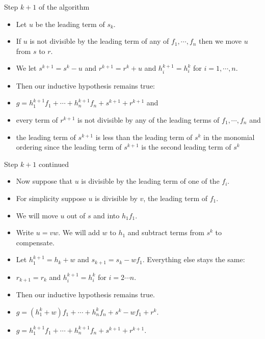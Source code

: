 \documentclass{beamer}
\begin{document}
\begin{frame}{Step $k+1$ of the algorithm}

\begin{itemize}
  \item Let $u$ be the leading term of $s_k$.
  \item If $u$ is not divisible by the leading term of any of $f_1,\cdots,f_n$ then we move $u$ from $s$ to $r$.
  \item We let $s^{k+1} = s^k - u$ and $r^{k+1} = r^k + u$ and $h_i^{k+1} = h_i^k$ for $i=1,\cdots,n$.
  \item Then our inductive hypothesis remains true:
  \item $g = h_1^{k+1} f_1 + \cdots + h_n^{k+1} f_n + s^{k+1} + r^{k+1}$ and
  \item every term of $r^{k+1}$ is not divisible by any of the leading terms of $f_1,\cdots, f_n$ and
  \item the leading term of $s^{k+1}$ is less than the leading term of $s^k$ in the monomial ordering since the leading
  term of $s^{k+1}$ is the second leading term of $s^k$
\end{itemize}

\end{frame}

\begin{frame}{Step $k+1$ continued}

\begin{itemize}
  \item Now suppose that $u$ is divisible by the leading term of one of the $f_i$.
  \item For simplicity suppose $u$ is divisible by $v$, the leading term of $f_1$.
  \item We will move $u$ out of $s$ and into $h_1 f_1$.
  \item Write $u = vw$. We will add $w$ to $h_1$ and subtract terms from $s^k$ to compensate.
  \item Let $h_1^{k+1} = h_k + w$ and $s_{k+1} = s_k - wf_1$. Everything else stays the same:
  \item $r_{k+1} = r_k$ and $h_i^{k+1} = h_i^k$ for $i = 2\cdots n$.
  \item Then our inductive hypothesis remains true.
  \item $g = (h_1^k + w) f_1 + \cdots + h_n^k f_n + s^k - wf_1 + r^k$.
  \item $g = h_1^{k+1} f_1 + \cdots + h_n^{k+1} f_n + s^{k+1} + r^{k+1}$.
\end{itemize}

\end{frame}
\end{document}

